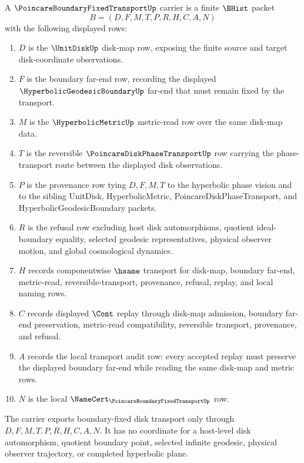 \begin{definition}
\label{def:poincare-boundary-fixed-transport-carrier}
A $\PoincareBoundaryFixedTransportUp$ carrier is a finite $\BHist$ packet
$$
B=(D,F,M,T,P,R,H,C,A,N)
$$
with the following displayed rows:
\begin{enumerate}
\item $D$ is the $\UnitDiskUp$ disk-map row, exposing the finite source and target disk-coordinate observations.
\item $F$ is the boundary far-end row, recording the displayed $\HyperbolicGeodesicBoundaryUp$ far-end that must remain fixed by the transport.
\item $M$ is the $\HyperbolicMetricUp$ metric-read row over the same disk-map data.
\item $T$ is the reversible $\PoincareDiskPhaseTransportUp$ row carrying the phase-transport route between the displayed disk observations.
\item $P$ is the provenance row tying $D,F,M,T$ to the hyperbolic phase vision and to the sibling UnitDisk, HyperbolicMetric, PoincareDiskPhaseTransport, and HyperbolicGeodesicBoundary packets.
\item $R$ is the refusal row excluding host disk automorphisms, quotient ideal-boundary equality, selected geodesic representatives, physical observer motion, and global cosmological dynamics.
\item $H$ records componentwise $\hsame$ transport for disk-map, boundary far-end, metric-read, reversible-transport, provenance, refusal, replay, and local naming rows.
\item $C$ records displayed $\Cont$ replay through disk-map admission, boundary far-end preservation, metric-read compatibility, reversible transport, provenance, and refusal.
\item $A$ records the local transport audit row: every accepted replay must preserve the displayed boundary far-end while reading the same disk-map and metric rows.
\item $N$ is the local $\NameCert_{\PoincareBoundaryFixedTransportUp}$ row.
\end{enumerate}
The carrier exports boundary-fixed disk transport only through $D,F,M,T,P,R,H,C,A,N$. It has no coordinate for a host-level disk automorphism, quotient boundary point, selected infinite geodesic, physical observer trajectory, or completed hyperbolic plane.
\end{definition}

